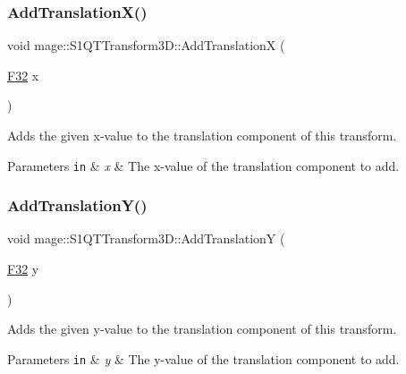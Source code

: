 \subsubsection{\texorpdfstring{Add\+Translation\+X()}{AddTranslationX()}}
{\footnotesize\ttfamily void mage\+::\+S1\+Q\+T\+Transform3\+D\+::\+Add\+TranslationX (\begin{DoxyParamCaption}\item[{\mbox{\hyperlink{namespacemage_aa97e833b45f06d60a0a9c4fc22ae02c0}{F32}}}]{x }\end{DoxyParamCaption})\hspace{0.3cm}{\ttfamily [noexcept]}}

Adds the given x-\/value to the translation component of this transform.


\begin{DoxyParams}[1]{Parameters}
\mbox{\tt in}  & {\em x} & The x-\/value of the translation component to add. \\
\hline
\end{DoxyParams}
\mbox{\label{classmage_1_1_s1_q_t_transform3_d_a51210d95c8d99c4f20fc4cacdb0a3785}} 
\subsubsection{\texorpdfstring{Add\+Translation\+Y()}{AddTranslationY()}}
{\footnotesize\ttfamily void mage\+::\+S1\+Q\+T\+Transform3\+D\+::\+Add\+TranslationY (\begin{DoxyParamCaption}\item[{\mbox{\hyperlink{namespacemage_aa97e833b45f06d60a0a9c4fc22ae02c0}{F32}}}]{y }\end{DoxyParamCaption})\hspace{0.3cm}{\ttfamily [noexcept]}}

Adds the given y-\/value to the translation component of this transform.


\begin{DoxyParams}[1]{Parameters}
\mbox{\tt in}  & {\em y} & The y-\/value of the translation component to add. \\
\hline
\end{DoxyParams}
\mbox{\label{classmage_1_1_s1_q_t_transform3_d_aa50121425ea0d87afc39575c09c83246}} 
